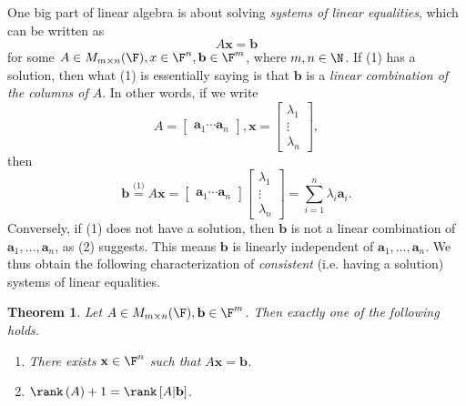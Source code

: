 \documentclass{article}
\newtheorem{theorem}{Theorem}
\renewcommand{\vec}{\mathbf}
\begin{document}
One big part of linear algebra is about solving \textit{systems of linear equalities}, which can be written as
\begin{equation}
    A\vec{x} = \vec{b}
\end{equation}
for some $A\in M_{m\times n}(\F), x\in\F^n, \vec{b}\in\F^m$, where $m,n\in\N$. If (1) has a solution, then what (1) is essentially saying is that $\vec{b}$ is a \textit{linear combination of the columns of $A$}. In other words, if we write
\begin{equation*}
    A = \begin{bmatrix} \vec{a}_1\cdots\vec{a}_n \end{bmatrix} , \vec{x} = \begin{bmatrix} \lambda_1\\\vdots\\\lambda_n \end{bmatrix} ,
\end{equation*}
then
\begin{equation}
    \vec{b} \overset{\text{(1)}}{=} A\vec{x} = \begin{bmatrix} \vec{a}_1\cdots\vec{a}_n \end{bmatrix} \begin{bmatrix} \lambda_1\\\vdots\\\lambda_n \end{bmatrix} = \sum^{n}_{i=1} \lambda_i\vec{a}_i.
\end{equation}
Conversely, if (1) does not have a solution, then $\vec{b}$ is not a linear combination of $\vec{a}_1,\ldots,\vec{a}_n$, as (2) suggests. This means $\vec{b}$ is linearly independent of $\vec{a}_1,\ldots,\vec{a}_n$. We thus obtain the following characterization of \textit{consistent} (i.e. having a solution) systems of linear equalities.

\begin{theorem}
    Let $A\in M_{m\times n}(\F), \vec{b}\in\F^m$. Then exactly one of the following holds.
    \begin{enumerate}
        \item There exists $\vec{x}\in\F^n$ such that $A\vec{x}=\vec{b}$.
        \item $\rank\left( A \right) + 1 = \rank\left[ A|\vec{b} \right]$.
    \end{enumerate}
\end{theorem}
\end{document}
